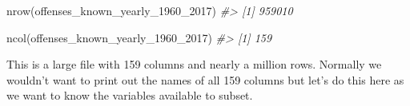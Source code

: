\documentclass[
]{krantz}
\makeatletter
\newenvironment{Shaded}{\begin{snugshade}}{\end{snugshade}}
\newcommand{\CommentTok}[1]{\textcolor[rgb]{0.37,0.37,0.37}{\textit{#1}}}
\newcommand{\FunctionTok}[1]{\textcolor[rgb]{0,0,0}{#1}}
\newcommand{\NormalTok}[1]{#1}
\newenvironment{kframe}{%
\medskip{}
\setlength{\fboxsep}{.8em}
 \def\at@end@of@kframe{}%
 \ifinner\ifhmode%
  \def\at@end@of@kframe{\end{minipage}}%
  \begin{minipage}{\columnwidth}%
 \fi\fi%
 \def\FrameCommand##1{\hskip\@totalleftmargin \hskip-\fboxsep
 \colorbox{shadecolor}{##1}\hskip-\fboxsep
     \hskip-\linewidth \hskip-\@totalleftmargin \hskip\columnwidth}%
 \MakeFramed {\advance\hsize-\width
   \@totalleftmargin\z@ \linewidth\hsize
   \@setminipage}}%
 {\par\unskip\endMakeFramed%
 \at@end@of@kframe}
\renewenvironment{Shaded}{\begin{kframe}}{\end{kframe}}
\makeatother
\begin{document}
\begin{Shaded}
\begin{Highlighting}[]
\FunctionTok{nrow}\NormalTok{(offenses\_known\_yearly\_1960\_2017)}
\CommentTok{\#\textgreater{} [1] 959010}
\end{Highlighting}
\end{Shaded}

\begin{Shaded}
\begin{Highlighting}[]
\FunctionTok{ncol}\NormalTok{(offenses\_known\_yearly\_1960\_2017)}
\CommentTok{\#\textgreater{} [1] 159}
\end{Highlighting}
\end{Shaded}

This is a large file with 159 columns and nearly a million rows. Normally we wouldn't want to print out the names of all 159 columns but let's do this here as we want to know the variables available to subset.
\end{document}
